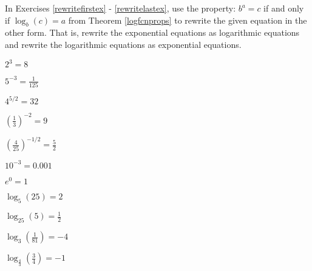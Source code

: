 \documentclass{ximera}
\begin{document}
	\author{Stitz-Zeager}


\begin{problem}
In Exercises \ref{rewritefirstex} - \ref{rewritelastex}, use the property: $b^{a} = c$ if and only if $\log_{b}(c) = a$ from Theorem \ref{logfcnprops} to rewrite the given equation in the other form.  That is, rewrite the exponential equations as logarithmic equations and rewrite the logarithmic equations as exponential equations.

\begin{question}\label{rewritefirstex}
$2^{3} = 8$
\end{question}

\begin{question}
$5^{-3} = \frac{1}{125}$
\end{question}

\begin{question}
$4^{5/2} = 32$ 
\end{question}

\begin{question}
$\left(\frac{1}{3}\right)^{-2} = 9$ 
\end{question}

\begin{question}
$\left(\frac{4}{25}\right)^{-1/2} = \frac{5}{2}$  
\end{question}

\begin{question}
$10^{-3} = 0.001$ 
\end{question}

\begin{question}
$e^{0}  = 1$ 
\end{question}

\begin{question}
$\log_{5}(25) = 2$
\end{question}

\begin{question}
$\log_{25} (5) = \frac{1}{2}$
\end{question}

\begin{question}
$\log_{3} \left(\frac{1}{81} \right) = -4$
\end{question}

\begin{question}
$\log_{\frac{4}{3}} \left(\frac{3}{4} \right) = -1$ 
\end{question}


\end{problem}
\end{document}
